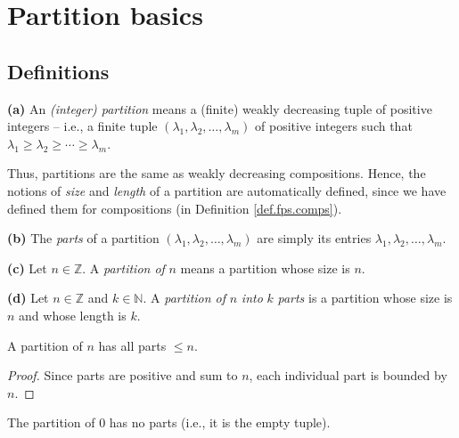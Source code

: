 \section{Partition basics}

\subsection{Definitions}

\begin{definition}
\label{def.pars.parts}
\leantarget
\leanok
\textbf{(a)} An \emph{(integer) partition} means a
(finite) weakly decreasing tuple of positive integers -- i.e., a finite tuple
$\left(  \lambda_{1},\lambda_{2},\ldots,\lambda_{m}\right)  $ of positive
integers such that $\lambda_{1}\geq\lambda_{2}\geq\cdots\geq\lambda_{m}$.

Thus, partitions are the same as weakly decreasing compositions. Hence, the
notions of \emph{size} and \emph{length} of a partition are automatically
defined, since we have defined them for compositions (in Definition
\ref{def.fps.comps}). \medskip

\textbf{(b)} The \emph{parts} of a partition $\left(  \lambda_{1},\lambda
_{2},\ldots,\lambda_{m}\right)  $ are simply its entries $\lambda_{1}%
,\lambda_{2},\ldots,\lambda_{m}$. \medskip

\textbf{(c)} Let $n\in\mathbb{Z}$. A \emph{partition of }$n$ means a partition
whose size is $n$. \medskip

\textbf{(d)} Let $n\in\mathbb{Z}$ and $k\in\mathbb{N}$. A \emph{partition of
}$n$\emph{ into }$k$\emph{ parts} is a partition whose size is $n$ and whose
length is $k$.
\end{definition}

\begin{lemma}
\label{lem.pars.parts-le}
\leanhelper
\leanok
A partition of $n$ has all parts $\leq n$.
\end{lemma}

\begin{proof}
\leanok
Since parts are positive and sum to $n$, each individual part is bounded by $n$.
\end{proof}

\begin{lemma}
\label{lem.pars.parts-zero}
\leanhelper
\leanok
The partition of $0$ has no parts (i.e., it is the empty tuple).
\end{lemma}

